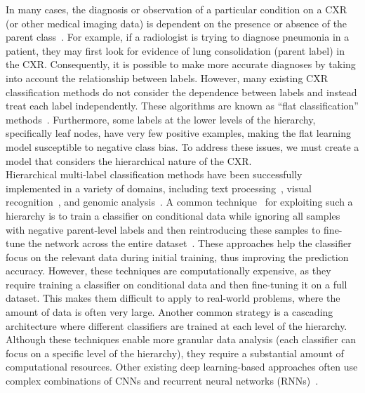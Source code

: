 In many cases, the diagnosis or observation of a particular condition on a CXR (or other medical imaging data) is dependent on the presence or absence of the parent class~\cite{vaneeden_Relationship_2012}. For example, if a radiologist is trying to diagnose pneumonia in a patient, they may first look for evidence of lung consolidation (parent label) in the CXR\@. Consequently, it is possible to make more accurate diagnoses by taking into account the relationship between labels\@. However, many existing CXR classification methods do not consider the dependence between labels and instead treat each label independently. These algorithms are known as ``flat classification'' methods~\cite{alaydie_Exploiting_2012}. Furthermore, some labels at the lower levels of the hierarchy, specifically leaf nodes, have very few positive examples, making the flat learning model susceptible to negative class bias. To address these issues, we must create a model that considers the hierarchical nature of the CXR\@.
\\
Hierarchical multi-label classification methods have been successfully implemented in a variety of domains, including text processing~\cite{aly_Hierarchical_2019}, visual recognition~\cite{bi_Mandatory_2014}, and genomic analysis~\cite{bi_BayesOptimal_2015}. A common technique~\cite{chen_Deep_2019} for exploiting such a hierarchy is to train a classifier on conditional data while ignoring all samples with negative parent-level labels and then reintroducing these samples to fine-tune the network across the entire dataset~\cite{chen_Deep_2019}. These approaches help the classifier focus on the relevant data during initial training, thus improving the prediction accuracy.  However, these techniques are computationally expensive, as they require training a classifier on conditional data and then fine-tuning it on a full dataset. This makes them difficult to apply to real-world problems, where the amount of data is often very large.   Another common strategy is a cascading architecture where different classifiers are trained at each level of the hierarchy. Although these techniques enable more granular data analysis (each classifier can focus on a specific level of the hierarchy), they require a substantial amount of computational resources. Other existing deep learning-based approaches often use complex combinations of CNNs and recurrent neural networks (RNNs)~\cite{guo_CNNRNN_2018,kowsari_HDLTex_2017}.

